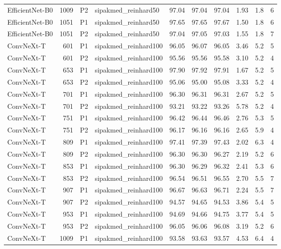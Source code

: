 {\begin{longtable}{lrllrrrrrr}
EfficientNet-B0 & 1009 & P2 & sipakmed\_reinhard50 & 97.04 & 97.04 & 97.04 & 1.93 & 1.8 & 6 \\
EfficientNet-B0 & 1051 & P1 & sipakmed\_reinhard50 & 97.65 & 97.65 & 97.67 & 1.50 & 1.8 & 6 \\
EfficientNet-B0 & 1051 & P2 & sipakmed\_reinhard50 & 97.04 & 97.05 & 97.03 & 1.55 & 1.8 & 7 \\
ConvNeXt-T & 601 & P1 & sipakmed\_reinhard100 & 96.05 & 96.07 & 96.05 & 3.46 & 5.2 & 5 \\
ConvNeXt-T & 601 & P2 & sipakmed\_reinhard100 & 95.56 & 95.56 & 95.58 & 3.10 & 5.2 & 4 \\
ConvNeXt-T & 653 & P1 & sipakmed\_reinhard100 & 97.90 & 97.92 & 97.91 & 1.67 & 5.2 & 5 \\
ConvNeXt-T & 653 & P2 & sipakmed\_reinhard100 & 95.06 & 95.00 & 95.08 & 3.33 & 5.2 & 4 \\
ConvNeXt-T & 701 & P1 & sipakmed\_reinhard100 & 96.30 & 96.31 & 96.31 & 2.67 & 5.2 & 5 \\
ConvNeXt-T & 701 & P2 & sipakmed\_reinhard100 & 93.21 & 93.22 & 93.26 & 5.78 & 5.2 & 4 \\
ConvNeXt-T & 751 & P1 & sipakmed\_reinhard100 & 96.42 & 96.44 & 96.46 & 2.76 & 5.3 & 5 \\
ConvNeXt-T & 751 & P2 & sipakmed\_reinhard100 & 96.17 & 96.16 & 96.16 & 2.65 & 5.9 & 4 \\
ConvNeXt-T & 809 & P1 & sipakmed\_reinhard100 & 97.41 & 97.39 & 97.43 & 2.02 & 6.3 & 4 \\
ConvNeXt-T & 809 & P2 & sipakmed\_reinhard100 & 96.30 & 96.30 & 96.27 & 2.19 & 5.2 & 6 \\
ConvNeXt-T & 853 & P1 & sipakmed\_reinhard100 & 96.30 & 96.29 & 96.32 & 2.41 & 5.3 & 6 \\
ConvNeXt-T & 853 & P2 & sipakmed\_reinhard100 & 96.54 & 96.51 & 96.55 & 2.70 & 5.5 & 7 \\
ConvNeXt-T & 907 & P1 & sipakmed\_reinhard100 & 96.67 & 96.63 & 96.71 & 2.24 & 5.5 & 7 \\
ConvNeXt-T & 907 & P2 & sipakmed\_reinhard100 & 94.57 & 94.65 & 94.53 & 3.86 & 5.4 & 5 \\
ConvNeXt-T & 953 & P1 & sipakmed\_reinhard100 & 94.69 & 94.66 & 94.75 & 3.77 & 5.4 & 5 \\
ConvNeXt-T & 953 & P2 & sipakmed\_reinhard100 & 96.05 & 96.06 & 96.08 & 3.19 & 5.2 & 6 \\
ConvNeXt-T & 1009 & P1 & sipakmed\_reinhard100 & 93.58 & 93.63 & 93.57 & 4.53 & 6.4 & 4 \\

\end{longtable}}
